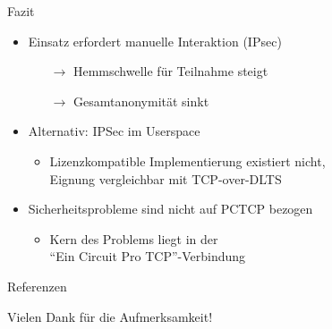 \documentclass{beamer}
\begin{document}
\begin{frame}{Fazit}
  \begin{itemize}
    \item Einsatz erfordert manuelle Interaktion (IPsec)
    \begin{itemize}
      \item[$\rightarrow$] Hemmschwelle für Teilnahme steigt
      \item[$\rightarrow$] Gesamtanonymität sinkt
    \end{itemize}
    \item Alternativ: IPSec im Userspace
    \begin{itemize}
      \item Lizenzkompatible Implementierung existiert nicht,\\Eignung vergleichbar mit TCP-over-DLTS
    \end{itemize}
    \item Sicherheitsprobleme sind nicht auf PCTCP bezogen
    \begin{itemize}
      \item Kern des Problems liegt in der\\ ``Ein Circuit Pro TCP''-Verbindung
    \end{itemize}
  \end{itemize}
\end{frame}




\begin{frame}[plain]{Referenzen}
  \begin{center}
  Vielen Dank für die Aufmerksamkeit!
  \end{center}
  \tiny
  
  
\end{frame}

\nocite{tor}
\nocite{tcp-over-dtls}
\nocite{pctcp}
\nocite{imux}
\nocite{tor_improvements}

\end{document}
